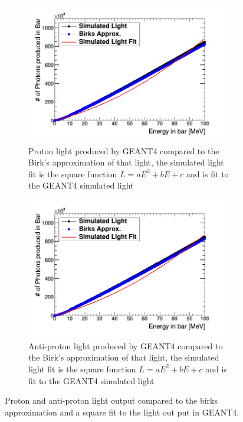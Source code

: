 \begin{figure}[htbp]
\centering
\begin{subfigure}{.5\textwidth}
  \centering
  \includegraphics[width=\linewidth]{light_of_protons0-100mev.png}
  \captionsetup{width=.9\linewidth}
  \caption{Proton light produced by GEANT4 compared to the Birk's approximation of that light, the simulated light fit is the square function $L = aE^2 + bE+ c$ and is fit to the GEANT4 simulated light}
  \label{subFig:proton_light}
\end{subfigure}%
\begin{subfigure}{.5\textwidth}
  \centering
  \includegraphics[width=\linewidth]{light_of_Aprotons0-100mev.png}
  \captionsetup{width=.9\linewidth}
  \caption{Anti-proton light produced by GEANT4 compared to the Birk's approximation of that light, the simulated light fit is the square function $L = aE^2 + bE+ c$ and is fit to the GEANT4 simulated light}
  \label{subFig:aproton_light}
\end{subfigure}
\caption{Proton and anti-proton light output compared to the birks approximation and a square fit to the light out put in GEANT4.}
\label{fig:proton_aproton_light}
\end{figure}
